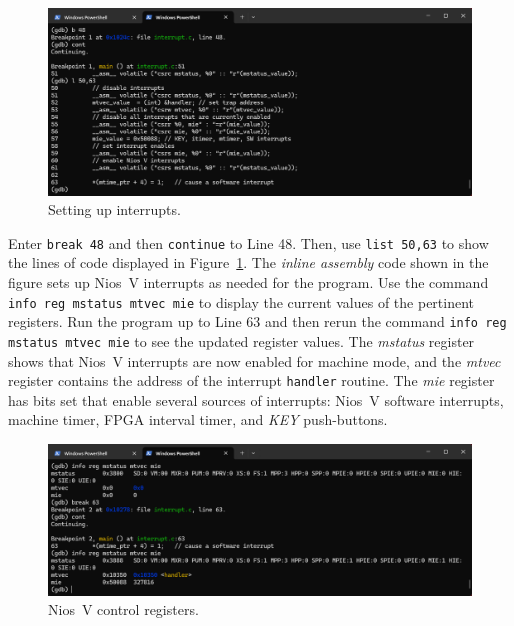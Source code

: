 \documentclass[11pt, twoside, pdftex]{article}
\begin{document}
\begin{figure}[h]
    \begin{center}
        \includegraphics[scale=.6]{figures/interrupt_C3.png}
        \caption{Setting up interrupts.}
        \label{fig:interrupt_C3}
    \end{center}
\end{figure}

Enter \texttt{break 48} and then \texttt{continue} to Line 48. Then, use \texttt{list 50,63}
to show the lines of code displayed in Figure~\ref{fig:interrupt_C3}. The {\it inline
assembly} code shown in the figure sets up Nios~V interrupts as needed for the program.
Use the command \texttt{info reg mstatus mtvec mie} to display the current values of the
pertinent registers. Run the program up to Line 63 and then rerun the command
\texttt{info reg mstatus mtvec mie} to see the updated register values. The {\it mstatus}
register shows that Nios~V interrupts are now enabled for machine mode, and the {\it mtvec}
register contains the address of the interrupt \texttt{handler} routine. The {\it mie}
register has bits set that enable several sources of interrupts: Nios~V software interrupts, 
machine timer, FPGA interval timer, and {\it KEY} push-buttons.

\begin{figure}[h]
    \begin{center}
        \includegraphics[scale=.6]{figures/interrupt_C4.png}
        \caption{Nios~V control registers.}
        \label{fig:interrupt_C4}
    \end{center}
\end{figure}
\end{document}
